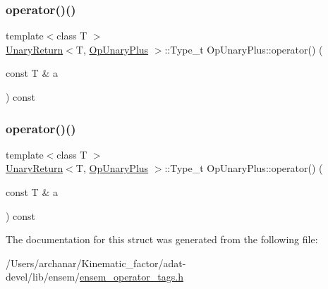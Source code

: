 \mbox{\label{structOpUnaryPlus_ad54a5d02fba52ca6cf35871d36aefab4}} 
\subsubsection{\texorpdfstring{operator()()}{operator()()}\hspace{0.1cm}{\footnotesize\ttfamily [2/3]}}
{\footnotesize\ttfamily template$<$class T $>$ \\
\mbox{\hyperlink{structUnaryReturn}{Unary\+Return}}$<$T, \mbox{\hyperlink{structOpUnaryPlus}{Op\+Unary\+Plus}} $>$\+::Type\+\_\+t Op\+Unary\+Plus\+::operator() (\begin{DoxyParamCaption}\item[{const T \&}]{a }\end{DoxyParamCaption}) const\hspace{0.3cm}{\ttfamily [inline]}}

\mbox{\label{structOpUnaryPlus_ad54a5d02fba52ca6cf35871d36aefab4}} 
\subsubsection{\texorpdfstring{operator()()}{operator()()}\hspace{0.1cm}{\footnotesize\ttfamily [3/3]}}
{\footnotesize\ttfamily template$<$class T $>$ \\
\mbox{\hyperlink{structUnaryReturn}{Unary\+Return}}$<$T, \mbox{\hyperlink{structOpUnaryPlus}{Op\+Unary\+Plus}} $>$\+::Type\+\_\+t Op\+Unary\+Plus\+::operator() (\begin{DoxyParamCaption}\item[{const T \&}]{a }\end{DoxyParamCaption}) const\hspace{0.3cm}{\ttfamily [inline]}}



The documentation for this struct was generated from the following file\+:\begin{DoxyCompactItemize}
\item 
/\+Users/archanar/\+Kinematic\+\_\+factor/adat-\/devel/lib/ensem/\mbox{\hyperlink{adat-devel_2lib_2ensem_2ensem__operator__tags_8h}{ensem\+\_\+operator\+\_\+tags.\+h}}\end{DoxyCompactItemize}
